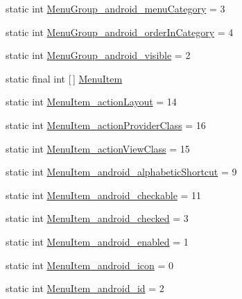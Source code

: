 \begin{DoxyCompactItemize}
\item 
static int \hyperlink{classandroid_1_1support_1_1v7_1_1appcompat_1_1R_1_1styleable_a35100e1fc0cb3941a2ad2c2959577785}{Menu\+Group\+\_\+android\+\_\+menu\+Category} = 3
\item 
static int \hyperlink{classandroid_1_1support_1_1v7_1_1appcompat_1_1R_1_1styleable_ac2d28f0b25e2c37ce47ebcdb3e77a354}{Menu\+Group\+\_\+android\+\_\+order\+In\+Category} = 4
\item 
static int \hyperlink{classandroid_1_1support_1_1v7_1_1appcompat_1_1R_1_1styleable_a33d810ee43eb154abdf62fc395a41cc6}{Menu\+Group\+\_\+android\+\_\+visible} = 2
\item 
static final int \mbox{[}$\,$\mbox{]} \hyperlink{classandroid_1_1support_1_1v7_1_1appcompat_1_1R_1_1styleable_a3161bf75811c963572105d304c98b088}{Menu\+Item}
\item 
static int \hyperlink{classandroid_1_1support_1_1v7_1_1appcompat_1_1R_1_1styleable_aa9ccfaac0ff76dfb80ddd32e3aaa8cdd}{Menu\+Item\+\_\+action\+Layout} = 14
\item 
static int \hyperlink{classandroid_1_1support_1_1v7_1_1appcompat_1_1R_1_1styleable_ac073414cb46c8a3e83defa8389f0edf3}{Menu\+Item\+\_\+action\+Provider\+Class} = 16
\item 
static int \hyperlink{classandroid_1_1support_1_1v7_1_1appcompat_1_1R_1_1styleable_aa4c4c88d63a6e2feeb8ed1bf4b4ee9ed}{Menu\+Item\+\_\+action\+View\+Class} = 15
\item 
static int \hyperlink{classandroid_1_1support_1_1v7_1_1appcompat_1_1R_1_1styleable_a38db6569328350109b52ba3309f4acea}{Menu\+Item\+\_\+android\+\_\+alphabetic\+Shortcut} = 9
\item 
static int \hyperlink{classandroid_1_1support_1_1v7_1_1appcompat_1_1R_1_1styleable_a1433c4a05cbb355a72bedbab97afd46d}{Menu\+Item\+\_\+android\+\_\+checkable} = 11
\item 
static int \hyperlink{classandroid_1_1support_1_1v7_1_1appcompat_1_1R_1_1styleable_a66e284a7841a55ccafec733792f58b10}{Menu\+Item\+\_\+android\+\_\+checked} = 3
\item 
static int \hyperlink{classandroid_1_1support_1_1v7_1_1appcompat_1_1R_1_1styleable_a103c4fa89f60f64ac3088a849b02a58e}{Menu\+Item\+\_\+android\+\_\+enabled} = 1
\item 
static int \hyperlink{classandroid_1_1support_1_1v7_1_1appcompat_1_1R_1_1styleable_a78b2cf536eb665f433feaa539b904381}{Menu\+Item\+\_\+android\+\_\+icon} = 0
\item 
static int \hyperlink{classandroid_1_1support_1_1v7_1_1appcompat_1_1R_1_1styleable_a4ba49d8b037ce6465e4c632c336e8363}{Menu\+Item\+\_\+android\+\_\+id} = 2

\end{DoxyCompactItemize}
